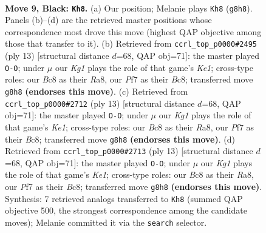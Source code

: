\documentclass[11pt]{article}
\begin{document}
\clearpage

\begin{figure}[p]\centering
\begin{subfigure}{0.46\textwidth}\centering
\resizebox{\linewidth}{!}{%
\newchessgame
\chessboard[
  setfen={rnbq1rk1/pp1nbppp/4p3/3P4/P2P3P/2N2N2/1P3PP1/R1BQKB1R b KQ - 0 9},
  showmover=false,
  pgfstyle=straightmove, color=movearrow, markmove={g8-h8}
]}
\caption{}
\end{subfigure}\hfill
\begin{subfigure}{0.46\textwidth}\centering
\resizebox{\linewidth}{!}{%
\newchessgame
\chessboard[
  setfen={rnbqk2r/pp1nppbp/3P2p1/2p5/3P1P2/2N2N2/PPP3PP/R1BQKB1R b KQkq - 0 7},
  showmover=false,
  pgfstyle=straightmove, color=movearrow, markmove={e8-g8}
]}
\caption{}
\end{subfigure}
\\[4pt]
\begin{subfigure}{0.46\textwidth}\centering
\resizebox{\linewidth}{!}{%
\newchessgame
\chessboard[
  setfen={rnbqk2r/pp1nppbp/3P2p1/2p5/3P1P2/2N2N2/PPP3PP/R1BQKB1R b KQkq - 0 7},
  showmover=false,
  pgfstyle=straightmove, color=movearrow, markmove={e8-g8}
]}
\caption{}
\end{subfigure}\hfill
\begin{subfigure}{0.46\textwidth}\centering
\resizebox{\linewidth}{!}{%
\newchessgame
\chessboard[
  setfen={rnbqk2r/pp1nppbp/3P2p1/2p5/3P1P2/2N2N2/PPP3PP/R1BQKB1R b KQkq - 0 7},
  showmover=false,
  pgfstyle=straightmove, color=movearrow, markmove={e8-g8}
]}
\caption{}
\end{subfigure}
\caption{\textbf{Move 9, Black: \texttt{Kh8}.} (a) Our position; Melanie plays \texttt{Kh8} (\texttt{g8h8}). Panels (b)--(d) are the retrieved master positions whose correspondence most drove this move (highest QAP objective among those that transfer to it). (b) Retrieved from \texttt{ccrl\_top\_p0000\#2495} (ply 13) [structural distance $d$=68, QAP obj=71]: the master played \texttt{O-O}; under $\mu$ our \emph{Kg1} plays the role of that game's \emph{Ke1}; cross-type roles: our \emph{B}c8 as their \emph{R}a8, our \emph{P}f7 as their \emph{B}c8; transferred move \texttt{g8h8} \textbf{(endorses this move)}. (c) Retrieved from \texttt{ccrl\_top\_p0000\#2712} (ply 13) [structural distance $d$=68, QAP obj=71]: the master played \texttt{O-O}; under $\mu$ our \emph{Kg1} plays the role of that game's \emph{Ke1}; cross-type roles: our \emph{B}c8 as their \emph{R}a8, our \emph{P}f7 as their \emph{B}c8; transferred move \texttt{g8h8} \textbf{(endorses this move)}. (d) Retrieved from \texttt{ccrl\_top\_p0000\#2713} (ply 13) [structural distance $d$=68, QAP obj=71]: the master played \texttt{O-O}; under $\mu$ our \emph{Kg1} plays the role of that game's \emph{Ke1}; cross-type roles: our \emph{B}c8 as their \emph{R}a8, our \emph{P}f7 as their \emph{B}c8; transferred move \texttt{g8h8} \textbf{(endorses this move)}. Synthesis: 7 retrieved analogs transferred to \texttt{Kh8} (summed QAP objective 500, the strongest correspondence among the candidate moves); Melanie committed it via the \texttt{search} selector.}
\label{fig:thought-m17}
\end{figure}
\end{document}
